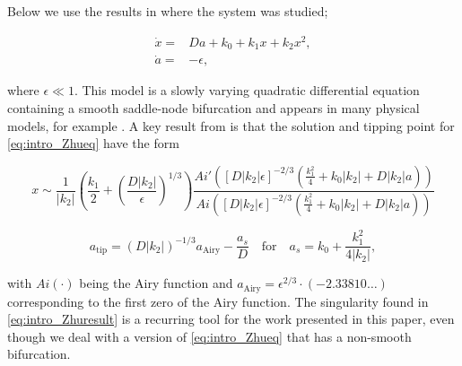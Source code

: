 Below we use the results in \cite{zhu2015tipping} where the system was studied;

\begin{equation}\label{eq:intro_Zhueq}
\begin{aligned}
\dot{x} =& Da + k_0 +k_1 x + k_2 x^2,\\
\dot{a} =& -\epsilon,
\end{aligned}
\end{equation}

where $\epsilon\ll 1$. This model is a slowly varying quadratic differential equation containing a smooth saddle-node bifurcation and appears in many physical models, for example \cite{erneux1989jump}. A key result from \cite{zhu2015tipping} is that the solution and tipping point for \eqref{eq:intro_Zhueq} have the form

\begin{equation}\label{eq:intro_Zhuairy}
x\sim \frac{1}{|k_2|}\left(\frac{k_1}{2}+\left(\frac{D|k_2|}{\epsilon}\right)^{1/3}\right)\frac{Ai'\left([D|k_2|\epsilon]^{-2/3}\left(\frac{k_1^2}{4}+k_0|k_2|+D|k_2|a\right)\right)}{Ai\left([D|k_2|\epsilon]^{-2/3}\left(\frac{k_1^2}{4}+k_0|k_2|+D|k_2|a\right)\right)}
\end{equation}

\begin{equation}\label{eq:intro_Zhuresult}
a_{\text{tip}}=(D|k_2|)^{-1/3}a_{\text{Airy}}-\frac{a_s}{D}\quad \text{for} \quad a_s = k_0+\frac{k_1^2}{4|k_2|},
\end{equation}

with $Ai(\cdot)$ being the Airy function and $a_{\text{Airy}}=\epsilon^{2/3}\cdot(-2.33810\ldots)$ corresponding to the first zero of the Airy function. The singularity found in \eqref{eq:intro_Zhuresult} is a recurring tool for the work presented in this paper, even though we deal with a version of \eqref{eq:intro_Zhueq} that has a non-smooth bifurcation.

